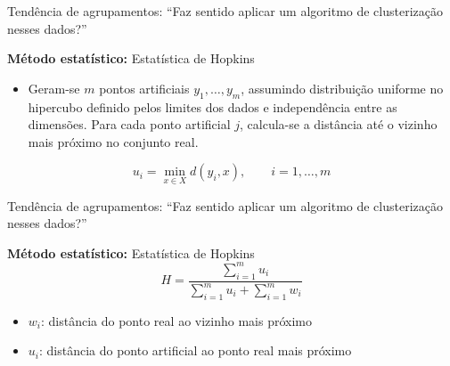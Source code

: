 \documentclass[
  ignorenonframetext,
  aspectratio=169,
]{beamer}
\providecommand{\tightlist}{%
  \setlength{\itemsep}{0pt}\setlength{\parskip}{0pt}}
\begin{document}
\begin{frame}{Tendência de agrupamentos: ``Faz sentido aplicar um
algoritmo de clusterização nesses dados?''}
\label{tenduxeancia-de-agrupamentos-faz-sentido-aplicar-um-algoritmo-de-clusterizauxe7uxe3o-nesses-dados-3}
\begin{block}{\textbf{Método estatístico:} Estatística de Hopkins}
\label{muxe9todo-estatuxedstico-estatuxedstica-de-hopkins-3}
\begin{itemize}
\tightlist
\item
  Geram-se \(m\) pontos artificiais \(y_1, \ldots, y_m\), assumindo
  distribuição uniforme no hipercubo definido pelos limites dos dados e
  independência entre as dimensões. Para cada ponto artificial \(j\),
  calcula-se a distância até o vizinho mais próximo no conjunto real.
\end{itemize}

\[
u_i
=
\min_{x \in X}
d(y_i, x),
\qquad i = 1,\ldots,m
\]
\end{block}
\end{frame}

\begin{frame}{Tendência de agrupamentos: ``Faz sentido aplicar um
algoritmo de clusterização nesses dados?''}
\label{tenduxeancia-de-agrupamentos-faz-sentido-aplicar-um-algoritmo-de-clusterizauxe7uxe3o-nesses-dados-4}
\begin{block}{\textbf{Método estatístico:} Estatística de Hopkins}
\label{muxe9todo-estatuxedstico-estatuxedstica-de-hopkins-4}
\[H = \dfrac{\sum \limits_{i=1}^m u_i}{\sum \limits_{i=1}^m u_i + \sum \limits_{i=1}^m w_i}\]

\begin{itemize}
\item
  \(w_i\): distância do ponto real ao vizinho mais próximo
\item
  \(u_i\): distância do ponto artificial ao ponto real mais próximo
\end{itemize}
\end{block}
\end{frame}
\end{document}
